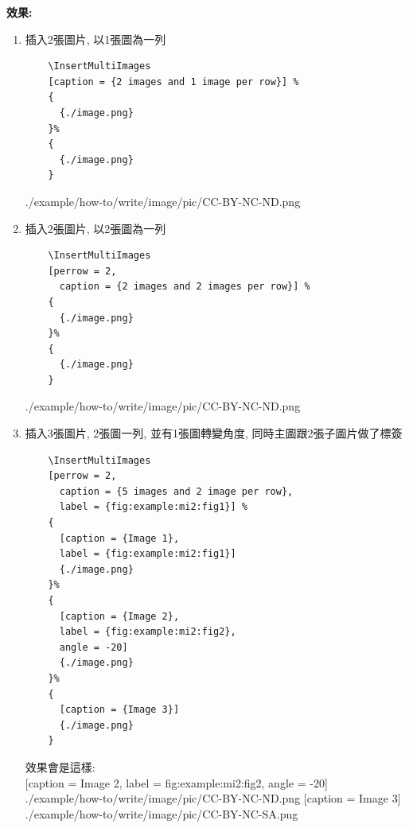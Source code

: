   {\bf 效果:}
  \begin{enumerate}
  \item
  {
    插入2張圖片, 以1張圖為一列
    \begin{verbatim}
    \InsertMultiImages
    [caption = {2 images and 1 image per row}] %
    {
      {./image.png}
    }%
    {
      {./image.png}
    }
    \end{verbatim}
    {
      {./example/how-to/write/image/pic/CC-BY-NC-ND.png}
    }
  } %

  \item
  {
    插入2張圖片, 以2張圖為一列
    \begin{verbatim}
    \InsertMultiImages
    [perrow = 2,
      caption = {2 images and 2 images per row}] %
    {
      {./image.png}
    }%
    {
      {./image.png}
    }
    \end{verbatim}
    {
      {./example/how-to/write/image/pic/CC-BY-NC-ND.png}
    }
  } %

  \newpage
  \item
  {
    插入3張圖片, 2張圖一列, 並有1張圖轉變角度, 同時主圖跟2張子圖片做了標簽
    \begin{verbatim}
    \InsertMultiImages
    [perrow = 2,
      caption = {5 images and 2 image per row},
      label = {fig:example:mi2:fig1}] %
    {
      [caption = {Image 1},
      label = {fig:example:mi2:fig1}]
      {./image.png}
    }%
    {
      [caption = {Image 2},
      label = {fig:example:mi2:fig2},
      angle = -20]
      {./image.png}
    }%
    {
      [caption = {Image 3}]
      {./image.png}
    }
    \end{verbatim}

    效果會是這樣: \\
    {
      [caption = {Image 2},
      label = {fig:example:mi2:fig2},
      angle = -20]
      {./example/how-to/write/image/pic/CC-BY-NC-ND.png}
    }%
    {
      [caption = {Image 3}]
      {./example/how-to/write/image/pic/CC-BY-NC-SA.png}
    }

}
\end{enumerate}
